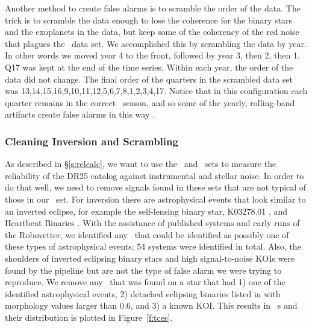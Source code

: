 Another method to create false alarms is to scramble the order of the data.  The trick is to scramble the data enough to lose the coherence for the binary stars and the exoplanets in the data, but keep some of the coherency of the red noise that plagues the \Kepler\ data set.  We accomplished this by scrambling the data by year. In other words we moved year 4 to the front, followed by year 3, then 2, then 1. Q17 was kept at the end of the time series. Within each year, the order of the data did not change. The final order of the quarters in the scrambled data set was 13,14,15,16,9,10,11,12,5,6,7,8,1,2,3,4,17.  Notice that in this configuration each quarter remains in the correct \Kepler\ season, and so some of the yearly, rolling-band artifacts create false alarms in this way \citep{KIH}.




\subsubsection{Cleaning Inversion and Scrambling}
\label{s:clean}
As described in \S\ref{s:relcalc}, we want to use the \invtce\ and \scrtce\ sets to measure the reliability of the DR25 catalog against instrumental and stellar noise.  In order to do that well, we need to remove signals found in these sets that are not typical of those in our \opstce\ set.  For inversion there are astrophysical events that look similar to an inverted eclipse, for example the self-lensing binary star, K03278.01 \citep{Kruse2014}, and Heartbeat Binaries \citep{Thompson2012}.  With the assistance of published systems and early runs of the Robovetter, we identified any \invtce\ that could be identified as possibly one of these types of astrophysical events; 54 systems were identified in total.  Also, the shoulders of inverted eclipsing binary stars and high signal-to-noise KOIs were found by the pipeline but are not the type of false alarm we were trying to reproduce.  We remove any \invtce\ that was found on a star that had 1) one of the identified astrophysical events, 2) detached eclipsing binaries listed in \citet{Kirk2016} with morphology values larger than 0.6, and 3) a known KOI.  This results in \ninvtces\ \invtce s and their distribution is plotted in Figure~\ref{f:tces}.

